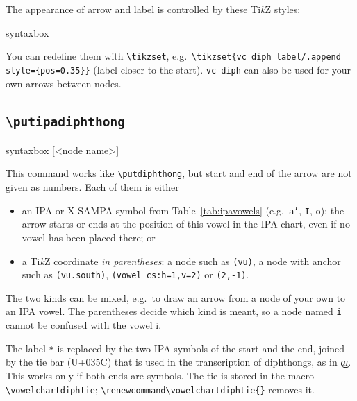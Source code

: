 \documentclass[a4paper,11pt]{article}
\newcommand\cmd[1]{\texttt{\textbackslash #1}}
\begin{document}
\noindent
The appearance of arrow and label is controlled by these Ti\textit{k}Z styles:

\begin{tcblisting}{syntaxbox}
\tikzset{
  vc diph label/.style={sloped, midway, inner sep=0pt},
  vc diph above/.style={above=0.5pt},   %
  vc diph below/.style={below=0.15em},  %
  vc diph on/.style={anchor=base},      %
}
\end{tcblisting}

\noindent
You can redefine them with \cmd{tikzset}, e.g.\ \verb|\tikzset{vc diph label/.append style={pos=0.35}}|
(label closer to the start).
\texttt{vc diph} can also be used for your own arrows between nodes.





\needspace{6em}
\subsection{\cmd{putipadiphthong}}\label{sec:ipadiph}

\begin{tcblisting}{syntaxbox}
[<node name>]
\end{tcblisting}

\noindent
This command works like \cmd{putdiphthong}, but start and end of the arrow are not given as numbers. Each of them is either

\begin{itemize}
	\item
	an IPA or X-SAMPA symbol from Table~\ref{tab:ipavowels} (e.g.\ \texttt{a'}, \texttt{I}, \texttt{ʊ}): the arrow starts or ends at the position of this vowel in the IPA chart, even if no vowel has been placed there; or
	\item
	a Ti\textit{k}Z coordinate \emph{in parentheses}: a node such as \verb|(vu)|, a node with anchor such as \verb|(vu.south)|, \verb|(vowel cs:h=1,v=2)| or \verb|(2,-1)|.
\end{itemize}

\noindent
The two kinds can be mixed, e.g.\ to draw an arrow from a node of your own to an IPA vowel. The parentheses decide which kind is meant, so a node named \texttt{i} cannot be confused with the vowel i.

The label \texttt{*} is replaced by the two IPA symbols of the start and the end, joined by the tie bar (U+035C) that is used in the transcription of diphthongs, as in \textit{a͜ɪ}. This works only if both ends are symbols. The tie is stored in the macro \cmd{vowelchartdiphtie}; \verb|\renewcommand\vowelchartdiphtie{}| removes it.
\end{document}
